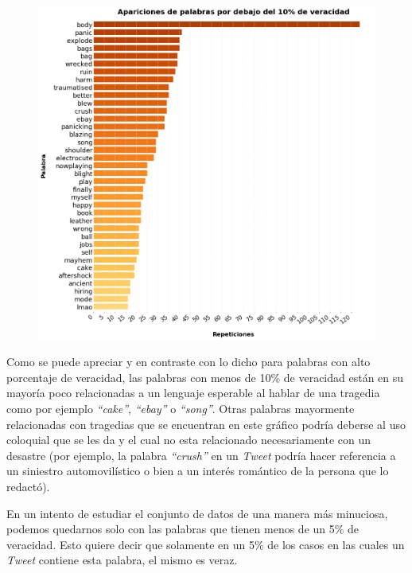 \documentclass[titlepage,a4paper]{article}
\begin{document}
    
    \begin{figure}[H]
    \centering
    \includegraphics[width=1\textwidth]{graficos/Analisis Lexico Grafico/apariciones_de_palabras_por_debajo_de_10_de_veracidad.png}
    \caption{} 
    \end{figure}
    Como se puede apreciar y en contraste con lo dicho  para palabras con alto porcentaje de veracidad, las palabras con menos de 10\% de veracidad están en su mayoría poco relacionadas a un lenguaje esperable al hablar de una tragedia como por ejemplo \textit{``cake''}, \textit{``ebay''} o \textit{``song''}. Otras palabras mayormente relacionadas con tragedias que se encuentran en este gráfico podría deberse al uso coloquial que se les da y el cual no esta relacionado necesariamente con un desastre (por ejemplo, la palabra \textit{``crush''} en un \textit{Tweet} podría hacer referencia a un siniestro automovilístico o bien a un interés romántico de la persona que lo redactó).
    

    En un intento de estudiar el conjunto de datos de una manera más minuciosa, podemos quedarnos solo con las palabras que tienen menos de un 5\% de veracidad. Esto quiere decir que solamente en un  5\% de los casos en las cuales un \textit{Tweet} contiene esta palabra, el mismo es veraz. 
    
\end{document}
